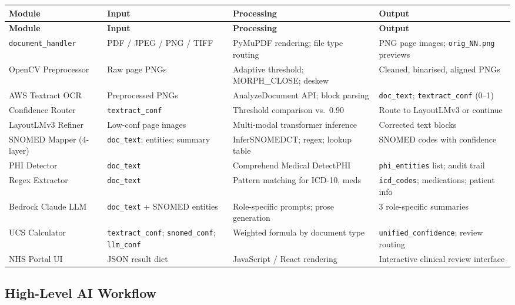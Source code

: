 \begin{longtable}{|p{3.3cm}|p{2.7cm}|p{3.9cm}|p{3.9cm}|}
\label{tab:module_descriptions} \\
\hline
\textbf{Module} & \textbf{Input} & \textbf{Processing} & \textbf{Output} \\
\hline
\endfirsthead
\hline
\textbf{Module} & \textbf{Input} & \textbf{Processing} & \textbf{Output} \\
\hline
\endhead
\hline
\endfoot
\texttt{document\_handler} & PDF / JPEG / PNG / TIFF & PyMuPDF rendering; file type routing & PNG page images; \texttt{orig\_NN.png} previews \\
\hline
OpenCV Preprocessor & Raw page PNGs & Adaptive threshold; MORPH\_CLOSE; deskew & Cleaned, binarised, aligned PNGs \\
\hline
AWS Textract OCR & Preprocessed PNGs & AnalyzeDocument API; block parsing & \texttt{doc\_text}; \texttt{textract\_conf} (0--1) \\
\hline
Confidence Router & \texttt{textract\_conf} & Threshold comparison vs.\ 0.90 & Route to LayoutLMv3 or continue \\
\hline
LayoutLMv3 Refiner & Low-conf page images & Multi-modal transformer inference & Corrected text blocks \\
\hline
SNOMED Mapper (4-layer) & \texttt{doc\_text}; entities; summary & InferSNOMEDCT; regex; lookup table & SNOMED codes with confidence \\
\hline
PHI Detector & \texttt{doc\_text} & Comprehend Medical DetectPHI & \texttt{phi\_entities} list; audit trail \\
\hline
Regex Extractor & \texttt{doc\_text} & Pattern matching for ICD-10, meds & \texttt{icd\_codes}; medications; patient info \\
\hline
Bedrock Claude LLM & \texttt{doc\_text} + SNOMED entities & Role-specific prompts; prose generation & 3 role-specific summaries \\
\hline
UCS Calculator & \texttt{textract\_conf}; \texttt{snomed\_conf}; \texttt{llm\_conf} & Weighted formula by document type & \texttt{unified\_confidence}; review routing \\
\hline
NHS Portal UI & JSON result dict & JavaScript / React rendering & Interactive clinical review interface \\
\hline
\end{longtable}

\subsection{High-Level AI Workflow}

